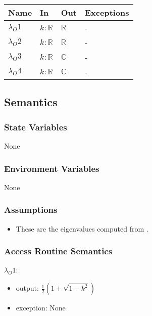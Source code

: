\documentclass[12pt, titlepage]{article}
\begin{document}
\begin{center}
	\begin{tabular}{p{3cm} p{3cm} p{3cm} >{\raggedright\arraybackslash}p{7cm}}
		\toprule
		\textbf{Name} & \textbf{In} & \textbf{Out} & \textbf{Exceptions} \\
		\hline
		$\lambda_O1$ & $k : \mathbb{R}$ & $\mathbb{R}$ & - \\
		$\lambda_O2$ & $k : \mathbb{R}$ & $\mathbb{R}$ & - \\ 
		$\lambda_O3$ & $k : \mathbb{R}$ & $\mathbb{C}$ & - \\
		$\lambda_O4$ & $k : \mathbb{R}$ & $\mathbb{C}$ & - \\ 
		\hline
	\end{tabular}
\end{center}

\subsection{Semantics}

\subsubsection{State Variables}

None

\subsubsection{Environment Variables}

None

\subsubsection{Assumptions}

\begin{itemize}
	\item These are the eigenvalues computed from \citet{SegaletAl}. 
\end{itemize}

\subsubsection{Access Routine Semantics}


$\lambda_O1$:
\begin{itemize}
	\item output: $\frac{1}{2} (1+\sqrt{1-k^{2}})$ 
	\item exception: None
\end{itemize}
\end{document}
